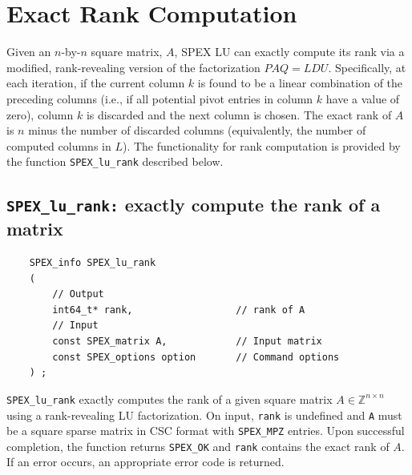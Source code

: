 \documentclass[12pt,oneside]{book}
\theoremstyle{definition}
\begin{document}
\section{Exact Rank Computation}
Given an $n$-by-$n$ square matrix, $A$, SPEX LU can exactly compute its rank via a modified, rank-revealing version of the factorization $PAQ = LDU$. Specifically, at each iteration, if the current column $k$ is found to be a linear combination of the preceding columns (i.e., if all potential pivot entries in column $k$ have a value of zero), column $k$ is discarded and the next column is chosen. The exact rank of $A$ is $n$ minus the number of discarded columns (equivalently, the number of computed columns in $L$). The functionality for rank computation is provided by
the function \verb|SPEX_lu_rank| described below.

\subsection{\texttt{SPEX\_lu\_rank:} exactly compute the rank of a matrix}
\begin{mdframed}[userdefinedwidth=\textwidth]
{\footnotesize
\begin{verbatim}
    SPEX_info SPEX_lu_rank
    (
        // Output
        int64_t* rank,                  // rank of A
        // Input
        const SPEX_matrix A,            // Input matrix
        const SPEX_options option       // Command options
    ) ;
\end{verbatim}
} \end{mdframed}

\verb|SPEX_lu_rank| exactly computes the rank of a given square matrix $A \in \mathbb{Z}^{n \times n}$ using a rank-revealing LU factorization. On input, \verb|rank| is undefined and \verb|A| must be a square sparse matrix in CSC format with \verb|SPEX_MPZ| entries. Upon successful completion, the function returns \verb|SPEX_OK| and \verb|rank| contains the exact rank of $A$. If an error occurs, an appropriate error code is returned.
\end{document}
